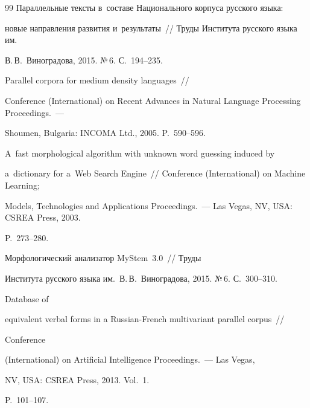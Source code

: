 {{\begin{thebibliography}{99}
 Параллельные тексты в~составе Национального корпуса русского языка: 


новые направления развития и~результаты~/\!\!/ Труды Института русского языка им.\ 


В.\,В.~Виноградова, 2015. №\,6. С.~194--235.




 Parallel corpora for medium density languages~/\!\!/  


Conference (International) on Recent Advances in Natural Language Processing  Proceedings.~--- 


Shoumen, Bulgaria: INCOMA Ltd., 2005. P.~590--596.




 A~fast morphological algorithm with unknown word guessing induced by 


a~dictionary for a~Web Search Engine~/\!\!/ Conference (International) on Machine Learning; 


Models, Technologies and Applications Proceedings.~--- Las Vegas, NV, USA: CSREA Press, 2003.  


P.~273--280.




 Морфологический анализатор MyStem~3.0~/\!\!/ Труды 


Института русского языка им.\ В.\,В.~Виноградова, 2015. №\,6. С.~300--310.







 Database of 


equivalent verbal forms in a Russian-French multivariant parallel corpus~/\!\!/ 


Conference 


(International) on Artificial Intelligence Proceedings.~---  Las Vegas,


NV, USA: CSREA Press, 2013. Vol.~1. 


P.~101--107.












\end{thebibliography}}}

